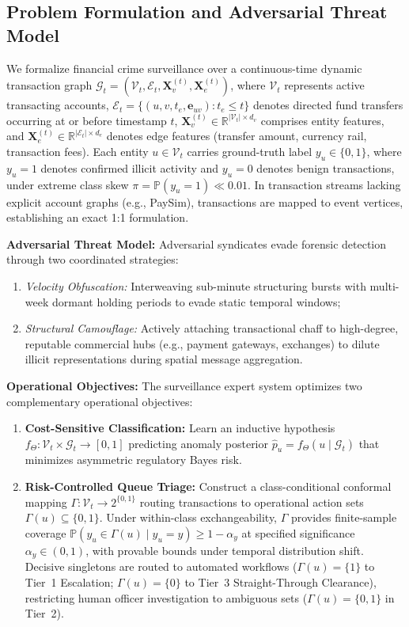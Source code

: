 \subsection{Problem Formulation and Adversarial Threat Model}
\label{sec:problem_formulation}
We formalize financial crime surveillance over a continuous-time dynamic transaction graph $\mathcal{G}_t = (\mathcal{V}_t, \mathcal{E}_t, \mathbf{X}_v^{(t)}, \mathbf{X}_e^{(t)})$, where $\mathcal{V}_t$ represents active transacting accounts, $\mathcal{E}_t = \{(u, v, t_e, \mathbf{e}_{uv}) : t_e \le t\}$ denotes directed fund transfers occurring at or before timestamp $t$, $\mathbf{X}_v^{(t)} \in \mathbb{R}^{|\mathcal{V}_t| \times d_v}$ comprises entity features, and $\mathbf{X}_e^{(t)} \in \mathbb{R}^{|\mathcal{E}_t| \times d_e}$ denotes edge features (transfer amount, currency rail, transaction fees). Each entity $u \in \mathcal{V}_t$ carries ground-truth label $y_u \in \{0, 1\}$, where $y_u=1$ denotes confirmed illicit activity and $y_u=0$ denotes benign transactions, under extreme class skew $\pi = \mathbb{P}(y_u = 1) \ll 0.01$. In transaction streams lacking explicit account graphs (e.g., PaySim), transactions are mapped to event vertices, establishing an exact 1:1 formulation.

\textbf{Adversarial Threat Model:} Adversarial syndicates evade forensic detection through two coordinated strategies:
\begin{enumerate}
    \item \textit{Velocity Obfuscation:} Interweaving sub-minute structuring bursts with multi-week dormant holding periods to evade static temporal windows;
    \item \textit{Structural Camouflage:} Actively attaching transactional chaff to high-degree, reputable commercial hubs (e.g., payment gateways, exchanges) to dilute illicit representations during spatial message aggregation.
\end{enumerate}

\textbf{Operational Objectives:} The surveillance expert system optimizes two complementary operational objectives:
\begin{enumerate}
    \item \textbf{Cost-Sensitive Classification:} Learn an inductive hypothesis $f_\Theta: \mathcal{V}_t \times \mathcal{G}_t \to [0, 1]$ predicting anomaly posterior $\hat{p}_u = f_\Theta(u \mid \mathcal{G}_t)$ that minimizes asymmetric regulatory Bayes risk.
    \item \textbf{Risk-Controlled Queue Triage:} Construct a class-conditional conformal mapping $\Gamma: \mathcal{V}_t \to 2^{\{0, 1\}}$ routing transactions to operational action sets $\Gamma(u) \subseteq \{0, 1\}$. Under within-class exchangeability, $\Gamma$ provides finite-sample coverage $\mathbb{P}(y_u \in \Gamma(u) \mid y_u = y) \ge 1 - \alpha_y$ at specified significance $\alpha_y \in (0, 1)$, with provable bounds under temporal distribution shift. Decisive singletons are routed to automated workflows ($\Gamma(u) = \{1\}$ to Tier~1 Escalation; $\Gamma(u) = \{0\}$ to Tier~3 Straight-Through Clearance), restricting human officer investigation to ambiguous sets ($\Gamma(u) = \{0, 1\}$ in Tier~2).
\end{enumerate}

